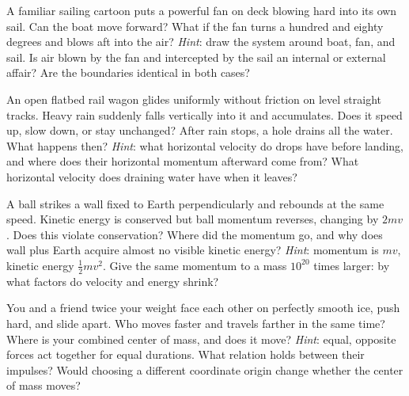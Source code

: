\begin{puzzles}
\item A familiar sailing cartoon puts a powerful fan on deck blowing hard into its own sail. Can the boat move forward? What if the fan turns a hundred and eighty degrees and blows aft into the air? \emph{Hint}: draw the system around boat, fan, and sail. Is air blown by the fan and intercepted by the sail an internal or external affair? Are the boundaries identical in both cases?
\item An open flatbed rail wagon glides uniformly without friction on level straight tracks. Heavy rain suddenly falls vertically into it and accumulates. Does it speed up, slow down, or stay unchanged? After rain stops, a hole drains all the water. What happens then? \emph{Hint}: what horizontal velocity do drops have before landing, and where does their horizontal momentum afterward come from? What horizontal velocity does draining water have when it leaves?
\item A ball strikes a wall fixed to Earth perpendicularly and rebounds at the same speed. Kinetic energy is conserved but ball momentum reverses, changing by \(2mv\). Does this violate conservation? Where did the momentum go, and why does wall plus Earth acquire almost no visible kinetic energy? \emph{Hint}: momentum is \(mv\), kinetic energy \(\tfrac12 mv^2\). Give the same momentum to a mass \(10^{20}\) times larger: by what factors do velocity and energy shrink?
\item You and a friend twice your weight face each other on perfectly smooth ice, push hard, and slide apart. Who moves faster and travels farther in the same time? Where is your combined center of mass, and does it move? \emph{Hint}: equal, opposite forces act together for equal durations. What relation holds between their impulses? Would choosing a different coordinate origin change whether the center of mass moves?
\end{puzzles}
